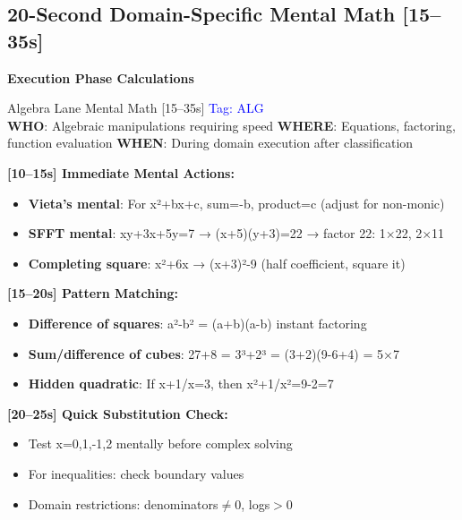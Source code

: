 \documentclass{article}
\begin{document}
\subsection{20-Second Domain-Specific Mental Math [15--35s]}
{\footnotesize\textcolor{timegreen}{}}\quad\textbf{Execution Phase Calculations}

\begin{mentalbox}{Algebra Lane Mental Math [15--35s]}
{\footnotesize\textcolor{timegreen}{}}\quad\textcolor{blue}{Tag: ALG}\\
\textbf{WHO}: Algebraic manipulations requiring speed
\textbf{WHERE}: Equations, factoring, function evaluation
\textbf{WHEN}: During domain execution after classification

\textbf{[10--15s] Immediate Mental Actions:}
\begin{itemize}[nosep]
\item \textbf{Vieta's mental}: For x²+bx+c, sum=-b, product=c (adjust for non-monic)
\item \textbf{SFFT mental}: xy+3x+5y=7 → (x+5)(y+3)=22 → factor 22: 1×22, 2×11
\item \textbf{Completing square}: x²+6x → (x+3)²-9 (half coefficient, square it)
\end{itemize}

\textbf{[15--20s] Pattern Matching:}
\begin{itemize}[nosep]
\item \textbf{Difference of squares}: a²-b² = (a+b)(a-b) instant factoring
\item \textbf{Sum/difference of cubes}: 27+8 = 3³+2³ = (3+2)(9-6+4) = 5×7
\item \textbf{Hidden quadratic}: If x+1/x=3, then x²+1/x²=9-2=7
\end{itemize}

\textbf{[20--25s] Quick Substitution Check:}
\begin{itemize}[nosep]
\item Test x=0,1,-1,2 mentally before complex solving
\item For inequalities: check boundary values
\item Domain restrictions: denominators$\neq0$, logs$>0$
\end{itemize}
\end{mentalbox}
\end{document}
